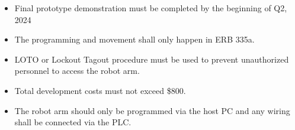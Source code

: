 \begin{itemize}
  \item Final prototype demonstration must be completed by the beginning of Q2, 2024
  \item The programming and movement shall only happen in ERB 335a.
  \item LOTO or Lockout Tagout procedure must be used to prevent unauthorized personnel to access the robot arm.
  \item Total development costs must not exceed \$800.
  \item The robot arm should only be programmed via the host PC and any wiring shall be connected via the PLC.
\end{itemize}
